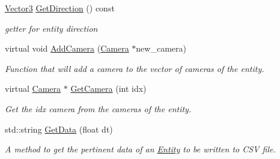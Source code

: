 \begin{DoxyCompactItemize}
\hyperlink{classVector3}{Vector3} \hyperlink{classEntity_aae3890ab5d3d17ef4f805e735890f077}{Get\+Direction} () const
\begin{DoxyCompactList}\small\item\em getter for entity direction \end{DoxyCompactList}\item 
virtual void \hyperlink{classEntity_a9f3c739a3ef623a9febc7801270ba719}{Add\+Camera} (\hyperlink{classCamera}{Camera} $\ast$new\+\_\+camera)
\begin{DoxyCompactList}\small\item\em Function that will add a camera to the vector of cameras of the entity. \end{DoxyCompactList}\item 
virtual \hyperlink{classCamera}{Camera} $\ast$ \hyperlink{classEntity_ae09d3e79d0d14c2990b1da52d2268399}{Get\+Camera} (int idx)
\begin{DoxyCompactList}\small\item\em Get the idx camera from the cameras of the entity. \end{DoxyCompactList}\item 
std\+::string \hyperlink{classEntity_a25fcdac45c906ba995f427ce6facab96}{Get\+Data} (float dt)
\begin{DoxyCompactList}\small\item\em A method to get the pertinent data of an \hyperlink{classEntity}{Entity} to be written to C\+SV file. \end{DoxyCompactList}\end{DoxyCompactItemize}
